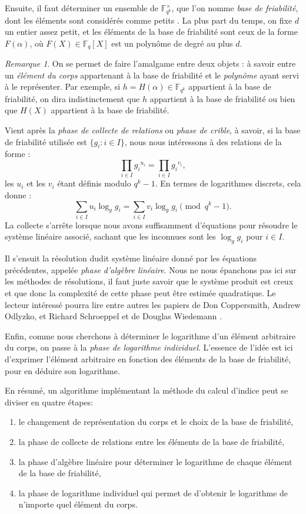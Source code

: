 \documentclass[a4paper, titlepage, 11pt]{article}
\theoremstyle{definition}
\theoremstyle{remark}
\newtheorem{rema}[theo]{Remarque}
\def\gf #1{\mathbb{F}_{#1}}
\begin{document}
Ensuite, il faut déterminer un ensemble de $\gf{q^k}^\times$, que l'on nomme \textit{base de friabilité}, dont les éléments sont considérés comme \og{}petits \fg{}. La plus part du temps, on fixe $d$ un entier assez petit, et les éléments de la base de friabilité sont ceux de la forme $F(\alpha)$, où $F(X)\in\gf{q}[X]$ est un polynôme de degré au plus $d$.

\begin{rema}
On se permet de faire l'amalgame entre deux objets : à savoir entre un \textit{élément du corps} appartenant à la base de friabilité et le \textit{polynôme} ayant servi à le représenter. Par exemple, si $h = H(\alpha)\in\gf{q^k}$ appartient à la base de friabilité, on dira indistinctement que $h$  appartient à la base de friabilité ou bien que $H(X)$ appartient à la base de friabilité.
\end{rema}

Vient après la \textit{phase de collecte de relations} ou \textit{phase de crible}, à savoir, si la base de friabilité utilisée est $\{g_i : i \in I\}$, nous nous intéressons à des relations de la forme :
$$\prod_{i\in I} {g_i}^{u_i} = \prod_{i\in I} {g_i}^{v_i},$$
les $u_i$ et les $v_i$ étant définis modulo $q^k-1$. En termes de logarithmes discrets, cela donne :
$$\sum_{i\in I} u_i \log_gg_i = \sum_{i\in I} v_i \log_gg_i \pmod{q^k-1}.$$
La collecte s’arrête lorsque nous avons suffisamment d'équations pour résoudre le système linéaire associé, sachant que les inconnues sont les $\log_gg_i$ pour  $i\in I$.

Il s'ensuit la résolution dudit système linéaire donné par les équations précédentes, appelée \textit{phase d'algèbre linéaire}. Nous ne nous épanchons pas ici sur les méthodes de résolutions, il faut juste savoir que le système produit est creux et que donc la complexité de cette phase peut être estimée quadratique. Le lecteur intéressé pourra lire entre autres les papiers de Don Coppersmith, Andrew Odlyzko, et Richard Schroeppel \cite{coppersmith1986} et de Douglas Wiedemann \cite{wiedemann1986}.

Enfin, comme nous cherchons à déterminer le logarithme d'un élément arbitraire du corps, on passe à la \textit{phase de logarithme individuel}. L'essence de l'idée est ici d'exprimer l'élément arbitraire en fonction des éléments de la base de friabilité, pour en déduire son logarithme.

En résumé, un algorithme implémentant la méthode du calcul d'indice peut se diviser en quatre étapes: \begin{enumerate}
\item le changement de représentation du corps et le choix de la base de friabilité,
\item la phase de collecte de relations entre les éléments de la base de friabilité,
\item la phase d'algèbre linéaire pour déterminer le logarithme de chaque élément de la base de friabilité,
\item la phase de logarithme individuel qui permet de d'obtenir le logarithme de n’importe quel élément du corps.
\end{enumerate}
\end{document}
